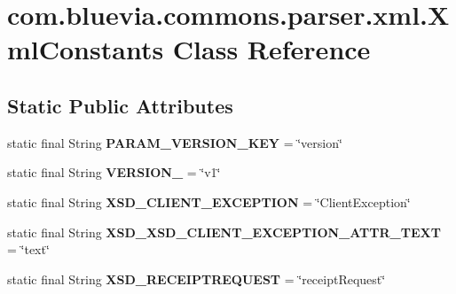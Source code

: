 \hypertarget{classcom_1_1bluevia_1_1commons_1_1parser_1_1xml_1_1XmlConstants}{
\section{com.bluevia.commons.parser.xml.XmlConstants Class Reference}
\label{classcom_1_1bluevia_1_1commons_1_1parser_1_1xml_1_1XmlConstants}
}
\subsection*{Static Public Attributes}
\begin{DoxyCompactItemize}
\item 
\hypertarget{classcom_1_1bluevia_1_1commons_1_1parser_1_1xml_1_1XmlConstants_a7b5efd48f94c10919474aad9ded3dfbd}{
static final String {\bfseries PARAM\_\-VERSION\_\-KEY} = \char`\"{}version\char`\"{}}
\label{classcom_1_1bluevia_1_1commons_1_1parser_1_1xml_1_1XmlConstants_a7b5efd48f94c10919474aad9ded3dfbd}

\item 
\hypertarget{classcom_1_1bluevia_1_1commons_1_1parser_1_1xml_1_1XmlConstants_a3033595a4314cfa5f11c8b3daeed76c9}{
static final String {\bfseries VERSION\_} = \char`\"{}v1\char`\"{}}
\label{classcom_1_1bluevia_1_1commons_1_1parser_1_1xml_1_1XmlConstants_a3033595a4314cfa5f11c8b3daeed76c9}

\item 
\hypertarget{classcom_1_1bluevia_1_1commons_1_1parser_1_1xml_1_1XmlConstants_a63c4088555dcbaaaf2a637d2f87e333d}{
static final String {\bfseries XSD\_\-CLIENT\_\-EXCEPTION} = \char`\"{}ClientException\char`\"{}}
\label{classcom_1_1bluevia_1_1commons_1_1parser_1_1xml_1_1XmlConstants_a63c4088555dcbaaaf2a637d2f87e333d}

\item 
\hypertarget{classcom_1_1bluevia_1_1commons_1_1parser_1_1xml_1_1XmlConstants_a268ff990d4d47fbddab5aad9d6c9b115}{
static final String {\bfseries XSD\_\-XSD\_\-CLIENT\_\-EXCEPTION\_\-ATTR\_\-TEXT} = \char`\"{}text\char`\"{}}
\label{classcom_1_1bluevia_1_1commons_1_1parser_1_1xml_1_1XmlConstants_a268ff990d4d47fbddab5aad9d6c9b115}

\item 
\hypertarget{classcom_1_1bluevia_1_1commons_1_1parser_1_1xml_1_1XmlConstants_aed9e0aae995c417e69fe7621a6e88911}{
static final String {\bfseries XSD\_\-RECEIPTREQUEST} = \char`\"{}receiptRequest\char`\"{}}
\label{classcom_1_1bluevia_1_1commons_1_1parser_1_1xml_1_1XmlConstants_aed9e0aae995c417e69fe7621a6e88911}


\end{DoxyCompactItemize}
